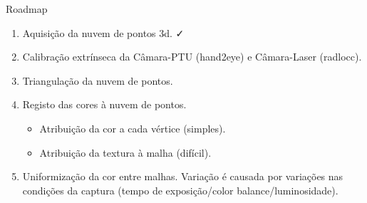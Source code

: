 \begin{frame}{Roadmap}
						    
	\begin{enumerate}
												        
		\item Aquisição da nuvem de pontos 3d. \faCheck
		      		      		      		      		      		      
		\item Calibração extrínseca da Câmara-PTU (hand2eye) e Câmara-Laser (radlocc).
		      		      		      		      		      		      
		\item Triangulação da nuvem de pontos.
		      		      		      		      		      		              
		\item Registo das cores à nuvem de pontos.
		      \begin{itemize}
		      	\item Atribuição da cor a cada vértice (simples).
		      	\item Atribuição da textura à malha (difícil).
		      \end{itemize}
		      		      		      		      		                    
		\item Uniformização da cor entre malhas. Variação é causada por variações nas condições da captura (tempo de exposição/color balance/luminosidade).
		      		      		      		      		      
	\end{enumerate}
						
\end{frame}